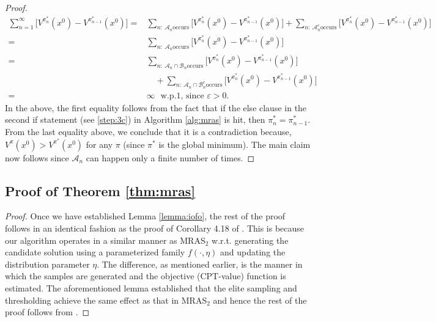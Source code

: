 \begin{proof}
\begin{align*}
\sum_{n=1}^{\infty}\big[V^{\pi^*_n}(x^0)-V^{\pi^*_{n-1}}(x^0)\big] 
=&\sum_{n:~\mathcal{A}_n \text{occurs}}\big[V^{\pi^*_n}(x^0)-V^{\pi^*_{n-1}}(x^0)\big]+\sum_{n:~\mathcal{A}_n^c \text{occurs}}\big[V^{\pi^*_n}(x^0)-V^{\pi^*_{n-1}}(x^0)\big] \\ 
=&\sum_{n:~\mathcal{A}_n \text{occurs}}\big[V^{\pi^*_n}(x^0)-V^{\pi^*_{n-1}}(x^0)\big]\\ 
=&\sum_{n:~\mathcal{A}_n\cap \mathcal{B}_n \text{occurs}}\big[V^{\pi^*_n}(x^0)-V^{\pi^*_{n-1}}(x^0)\big]\\
&\quad +\sum_{n:~\mathcal{A}_n\cap \mathcal{B}_n^c \text{occurs}}\big[V^{\pi^*_n}(x^0)-V^{\pi^*_{n-1}}(x^0)\big] \\ 
=&\infty \text{~~w.p.1, since $\varepsilon>0$.}
\end{align*}
In the above, the first equality follows from the fact that if the else clause in the second if statement (see \ref{step:3c}) in Algorithm \ref{alg:mras} is hit, then $\pi^*_{n} = \pi^*_{n-1}$.
%
From the last equality above, we conclude that it is a contradiction because, $V^\pi(x^0) > V^{\pi^*}(x^0)$ for any $\pi$ (since $\pi^*$ is the global minimum). The main claim now follows since $\mathcal{A}_n$ can happen only a finite number of times.
\end{proof}

\subsection*{Proof of Theorem \ref{thm:mras}}
\begin{proof}
Once we have established Lemma \ref{lemma:iofo}, the rest of the proof follows in an identical fashion as the proof of Corollary 4.18 of \cite{chang2013simulation}. This is because our algorithm operates in a similar manner as MRAS$_2$ w.r.t. generating the candidate solution using a parameterized family $f(\cdot, \eta)$ and updating the distribution parameter $\eta$. The difference, as mentioned earlier, is the manner in which the samples are generated and the objective (CPT-value) function is estimated. The aforementioned lemma established that the elite sampling and thresholding achieve the same effect as that in MRAS$_2$ and hence the rest of the proof follows from \cite{chang2013simulation}.
\end{proof}





